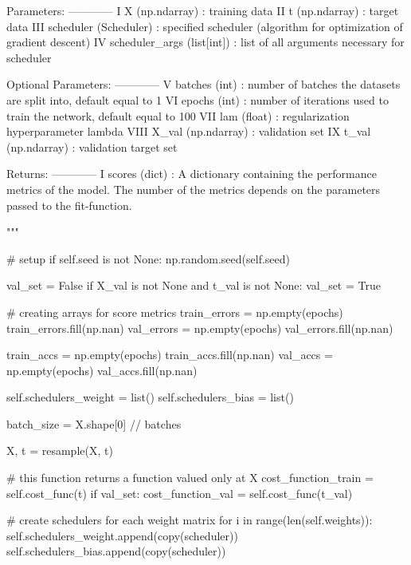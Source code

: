 \documentclass[%
oneside,                 %
final,                   %
10pt]{article}
\begin{document}
        Parameters:
        ------------
            I    X (np.ndarray) : training data
            II   t (np.ndarray) : target data
            III  scheduler (Scheduler) : specified scheduler (algorithm for optimization of gradient descent)
            IV   scheduler_args (list[int]) : list of all arguments necessary for scheduler

        Optional Parameters:
        ------------
            V    batches (int) : number of batches the datasets are split into, default equal to 1
            VI   epochs (int) : number of iterations used to train the network, default equal to 100
            VII  lam (float) : regularization hyperparameter lambda
            VIII X_val (np.ndarray) : validation set
            IX   t_val (np.ndarray) : validation target set

        Returns:
        ------------
            I   scores (dict) : A dictionary containing the performance metrics of the model.
                The number of the metrics depends on the parameters passed to the fit-function.

        """

        # setup 
        if self.seed is not None:
            np.random.seed(self.seed)

        val_set = False
        if X_val is not None and t_val is not None:
            val_set = True

        # creating arrays for score metrics
        train_errors = np.empty(epochs)
        train_errors.fill(np.nan)
        val_errors = np.empty(epochs)
        val_errors.fill(np.nan)

        train_accs = np.empty(epochs)
        train_accs.fill(np.nan)
        val_accs = np.empty(epochs)
        val_accs.fill(np.nan)

        self.schedulers_weight = list()
        self.schedulers_bias = list()

        batch_size = X.shape[0] // batches

        X, t = resample(X, t)

        # this function returns a function valued only at X
        cost_function_train = self.cost_func(t)
        if val_set:
            cost_function_val = self.cost_func(t_val)

        # create schedulers for each weight matrix
        for i in range(len(self.weights)):
            self.schedulers_weight.append(copy(scheduler))
            self.schedulers_bias.append(copy(scheduler))
\end{document}
